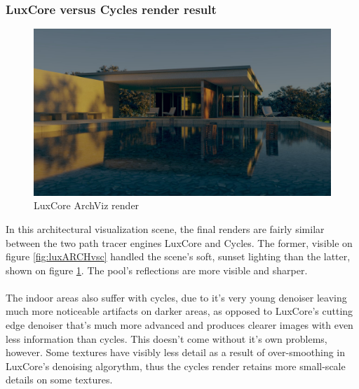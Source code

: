 \documentclass[conference]{IEEEtran}
\begin{document}
\subsubsection{LuxCore versus Cycles render result}

     
     
      \begin{figure}[htbp]
        \centering
        \includegraphics[scale=0.2]{Images/ARCHlux.jpg}
        
        \caption{LuxCore ArchViz render}
        \label{fig:cyclesARCHvsc}
    \end{figure}
     
    In this architectural visualization scene, the final renders are fairly similar between the two path tracer engines LuxCore and Cycles. The former, visible on figure \ref{fig:luxARCHvsc} handled the scene's soft, sunset lighting than the latter, shown on figure \ref{fig:cyclesARCHvsc}. The pool's reflections are more visible and sharper. 
    \\\\
    
    The indoor areas also suffer with cycles, due to it's very young denoiser leaving much more noticeable artifacts on darker areas, as opposed to LuxCore's cutting edge denoiser that's much more advanced and produces clearer images with even less information than cycles. This doesn't come without it's own problems, however. Some textures have visibly less detail as a result of over-smoothing in LuxCore's denoising algorythm, thus the cycles render retains more small-scale details on some textures.\\
\end{document}
